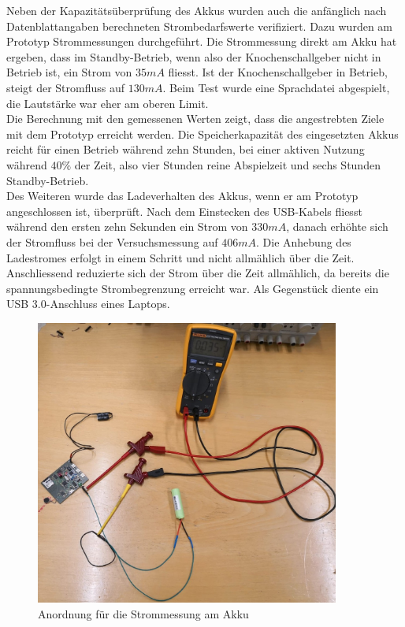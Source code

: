 Neben der Kapazitätsüberprüfung des Akkus wurden auch die anfänglich nach Datenblattangaben berechneten Strombedarfswerte verifiziert. Dazu wurden am Prototyp Strommessungen durchgeführt. Die Strommessung direkt am Akku hat ergeben, dass im Standby-Betrieb, wenn also der Knochenschallgeber nicht in Betrieb ist, ein Strom von $35mA$ fliesst. Ist der Knochenschallgeber in Betrieb, steigt der Stromfluss auf $130mA$. Beim Test wurde eine Sprachdatei abgespielt, die Lautstärke war eher am oberen Limit.\\

Die Berechnung mit den gemessenen Werten zeigt, dass die angestrebten Ziele mit dem Prototyp erreicht werden. Die Speicherkapazität des eingesetzten Akkus reicht für einen Betrieb während zehn Stunden, bei einer aktiven Nutzung während $40\%$ der Zeit, also vier Stunden reine Abspielzeit und sechs Stunden Standby-Betrieb.\\

Des Weiteren wurde das Ladeverhalten des Akkus, wenn er am Prototyp angeschlossen ist, überprüft. Nach dem Einstecken des USB-Kabels fliesst während den ersten zehn Sekunden ein Strom von $330mA$, danach erhöhte sich der Stromfluss bei der Versuchsmessung auf $406mA$. Die Anhebung des Ladestromes erfolgt in einem Schritt und nicht allmählich über die Zeit. Anschliessend reduzierte sich der Strom über die Zeit allmählich, da bereits die spannungsbedingte Strombegrenzung erreicht war. Als Gegenstück diente ein USB 3.0-Anschluss eines Laptops.\\


\begin{figure}[htp]
	\centering
	\includegraphics[width=10cm]{Bilder/StrommessungAkku.JPG}
	 \caption{Anordnung für die Strommessung am Akku}
	 \label{fig:StrommessungAkku}
\end{figure}


